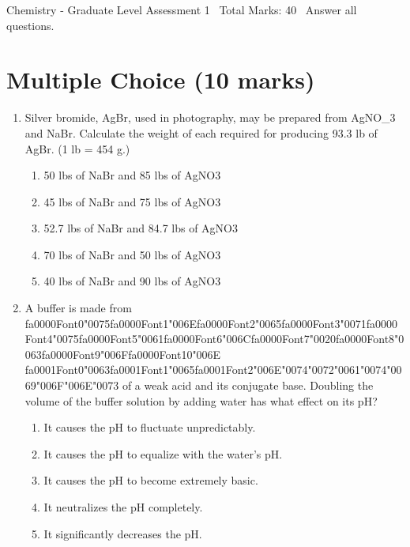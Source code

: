 \documentclass[12pt]{article}
\begin{document}
\begin{center}
Chemistry - Graduate Level Assessment 1 \
Total Marks: 40 \
Answer all questions.
\end{center}

\section*{Multiple Choice (10 marks)}
\begin{enumerate}[label=\arabic*.]
\item Silver bromide, AgBr, used in photography, may be prepared from AgNO\_3 and NaBr. Calculate
the weight of each required for producing 93.3 lb of AgBr. (1 lb = 454 g.)
\begin{enumerate}[label=(\alph*)]
    \item 50 lbs of NaBr and 85 lbs of AgNO3
    \item 45 lbs of NaBr and 75 lbs of AgNO3
    \item 52.7 lbs of NaBr and 84.7 lbs of AgNO3
    \item 70 lbs of NaBr and 50 lbs of AgNO3
    \item 40 lbs of NaBr and 90 lbs of AgNO3
\end{enumerate}
\item A buffer is made from {\csname fa0000Font0\endcsname\char"0075}{\csname fa0000Font1\endcsname\char"006E}{\csname fa0000Font2\endcsname\char"0065}{\csname fa0000Font3\endcsname\char"0071}{\csname fa0000Font4\endcsname\char"0075}{\csname fa0000Font5\endcsname\char"0061}{\csname fa0000Font6\endcsname\char"006C}{\csname fa0000Font7\endcsname\char"0020}{\csname fa0000Font8\endcsname\char"0063}{\csname fa0000Font9\endcsname\char"006F}{\csname fa0000Font10\endcsname\char"006E} {\csname fa0001Font0\endcsname\char"0063}{\csname fa0001Font1\endcsname\char"0065}{\csname fa0001Font2\endcsname\char"006E}{\char"0074}{\char"0072}{\char"0061}{\char"0074}{\char"0069}{\char"006F}{\char"006E}{\char"0073} of a weak acid and its conjugate base. Doubling
the volume of the buffer solution by adding water has what effect on its pH?
\begin{enumerate}[label=(\alph*)]
    \item It causes the pH to fluctuate unpredictably.
    \item It causes the pH to equalize with the water's pH.
    \item It causes the pH to become extremely basic.
    \item It neutralizes the pH completely.
    \item It significantly decreases the pH.

\end{enumerate}
\end{enumerate}
\end{document}
